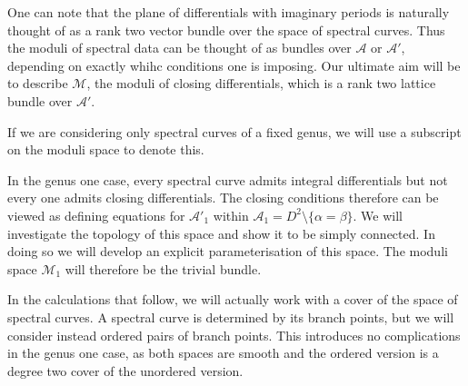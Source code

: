 One can note that the plane of differentials with imaginary periods is naturally thought of as a rank two vector bundle over the space of spectral curves. Thus the moduli of spectral data can be thought of as bundles over $\mathcal{A}$ or $\mathcal{A'}$, depending on exactly whihc conditions one is imposing. Our ultimate aim will be to describe $\mathcal{M}$, the moduli of closing differentials, which is a rank two lattice bundle over $\mathcal{A'}$.

If we are considering only spectral curves of a fixed genus, we will use a subscript on the moduli space to denote this.

In the genus one case, every spectral curve admits integral differentials but not every one admits closing differentials. The closing conditions therefore can be viewed as defining equations for $\mathcal{A'}_1$ within $\mathcal{A}_1 = D^2 \setminus \{α=β\}$. We will investigate the topology of this space and show it to be simply connected. In doing so we will develop an explicit parameterisation of this space. The moduli space $\mathcal{M}_1$ will therefore be the trivial bundle.

In the calculations that follow, we will actually work with a cover of the space of spectral curves. A spectral curve is determined by its branch points, but we will consider instead ordered pairs of branch points. This introduces no complications in the genus one case, as both spaces are smooth and the ordered version is a degree two cover of the unordered version.








